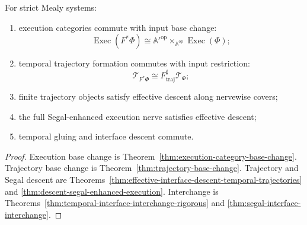 \begin{theorem}
\label{thm:temporal-interface-locality-summary}
For strict Mealy systems:
\begin{enumerate}
    \item execution categories commute with input base change:
    \[
        \operatorname{Exec}(F^\ast\Phi)
        \cong
        \mathbb A'^{\mathrm{op}}
        \times_{\mathbb A^{\mathrm{op}}}
        \operatorname{Exec}(\Phi);
    \]
    \item temporal trajectory formation commutes with input restriction:
    \[
        \mathscr T_{F^\ast\Phi}
        \cong
        F^\sharp_{\mathrm{traj}}\mathscr T_\Phi;
    \]
    \item finite trajectory objects satisfy effective descent along nervewise
    covers;
    \item the full Segal-enhanced execution nerve satisfies effective
    descent;
    \item temporal gluing and interface descent commute.
\end{enumerate}
\end{theorem}

\begin{proof}
Execution base change is
Theorem~\ref{thm:execution-category-base-change}.
Trajectory base change is
Theorem~\ref{thm:trajectory-base-change}.
Trajectory and Segal descent are
Theorems~\ref{thm:effective-interface-descent-temporal-trajectories} and
\ref{thm:descent-segal-enhanced-execution}.
Interchange is
Theorems~\ref{thm:temporal-interface-interchange-rigorous} and
\ref{thm:segal-interface-interchange}.
\end{proof}

